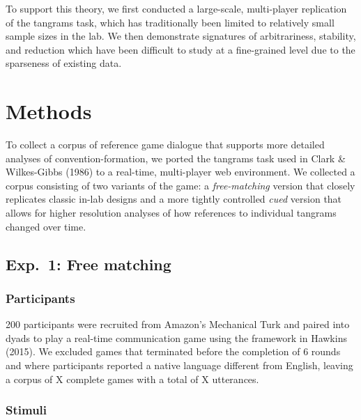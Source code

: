 \documentclass[alpha-refs]{wiley-article}
\begin{document}
To support this theory, we first conducted a large-scale, multi-player
replication of the tangrams task, which has traditionally been limited
to relatively small sample sizes in the lab. We then demonstrate signatures
of arbitrariness, stability, and reduction which have been difficult to
study at a fine-grained level due to the sparseness of existing data.

\section{Methods}

To collect a corpus of reference game dialogue that supports more
detailed analyses of convention-formation, we ported the tangrams task
used in Clark \& Wilkes-Gibbs (1986) to a real-time, multi-player web
environment. 
We collected a corpus consisting of two variants of the game: a \emph{free-matching} version that closely replicates classic in-lab designs and a more tightly controlled \emph{cued} version that allows for higher resolution analyses of how references to individual tangrams changed over time. 

\subsection{Exp.~1: Free matching}

\subsubsection{Participants}\label{participants}

200 participants were recruited from Amazon's Mechanical Turk and paired
into dyads to play a real-time communication game using the framework in
Hawkins (2015). We excluded games that terminated before the completion
of 6 rounds and where participants reported a native language different
from English, leaving a corpus of X complete games with a total of
X utterances.

\subsubsection{Stimuli}\label{stimuli}
\end{document}
